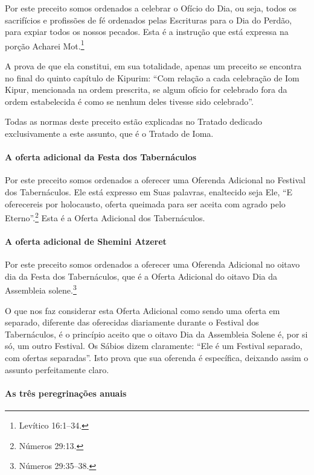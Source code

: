\begin{multicols}{2}
Por este preceito somos ordenados a celebrar o Ofício do Dia, ou seja,
todos os sacrifícios e profissões de fé ordenados pelas Escrituras para
o Dia do Perdão, para expiar todos os nossos pecados. Esta é a instrução
que está expressa na porção Acharei Mot\starr.\footnote{Levítico 16:1--34.}

A prova de que ela constitui, em sua totalidade, apenas um preceito se
encontra no final do quinto capítulo de Kipurim\starr: ``Com relação a cada
celebração de Iom Kipur\starr, mencionada na ordem prescrita, se algum
ofício for celebrado fora da ordem estabelecida é como se nenhum deles
tivesse sido celebrado''.

Todas as normas deste preceito estão explicadas no Tratado dedicado
exclusivamente a este assunto, que é o Tratado de Ioma\starr.

\paragraph{A oferta adicional da Festa dos Tabernáculos}

Por este preceito somos ordenados a oferecer uma Oferenda Adicional no
Festival dos Tabernáculos. Ele está expresso em Suas palavras,
enaltecido seja Ele, ``E oferecereis por holocausto, oferta queimada
para ser aceita com agrado pelo Eterno''.\footnote{Números 29:13.} Esta é a
Oferta Adicional dos Tabernáculos.

\paragraph{A oferta adicional de Shemini Atzeret\starr}

Por este preceito somos ordenados a oferecer uma Oferenda Adicional no
oitavo dia da Festa dos Tabernáculos, que é a Oferta Adicional do oitavo
Dia da Assembleia solene.\footnote{Números 29:35--38.}

O que nos faz considerar esta Oferta Adicional como sendo uma oferta em
separado, diferente das oferecidas diariamente durante o Festival dos
Tabernáculos, é o princípio aceito que o oitavo Dia da Assembleia Solene
é, por si só, um outro Festival. Os Sábios dizem claramente: ``Ele é um
Festival separado, com ofertas separadas''. Isto prova que sua oferenda
é específica, deixando assim o assunto perfeitamente claro.

\paragraph{As três peregrinações anuais}


\end{multicols}
